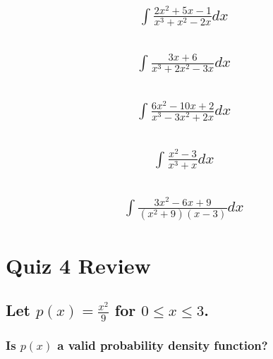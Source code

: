 \documentclass{article}
\begin{document}
\subsection{
	\begin{align*}
		\int{\frac{2x^2 + 5x - 1}{x^3 + x^2 - 2x} dx}
	\end{align*}
}

\subsection{
	\begin{align*}
		\int{\frac{3x + 6}{x^3 + 2x^2 - 3x} dx}
	\end{align*}
}

\subsection{
	\begin{align*}
		\int{\frac{6x^2 - 10x + 2}{x^3 - 3x^2 + 2x} dx}
	\end{align*} 
}

\subsection{
	\begin{align*}
		\int{\frac{x^2 - 3}{x^3 + x} dx}
	\end{align*} 
}

\subsection{
	\begin{align*}
		\int{\frac{3x^2 - 6x + 9}{(x^2 + 9)(x - 3)} dx}
	\end{align*}
}

\newpage
\section{Quiz 4 Review}

\subsection{Let $p(x) = \frac{x^2}{9}$ for $0 \leq x \leq 3$.}

\subsubsection{Is $p(x)$ a valid probability density function?}
\end{document}
